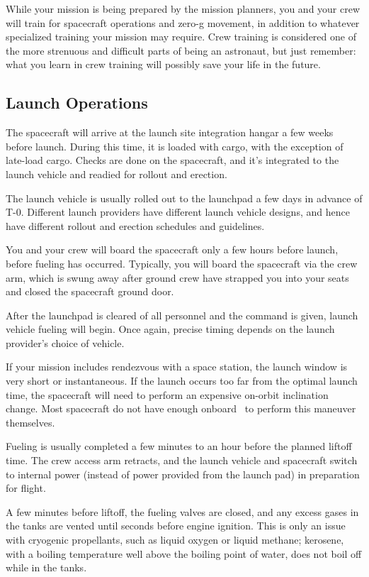 While your mission is being prepared by the mission planners, you and
your crew will train for spacecraft operations and zero-g movement, in
addition to whatever specialized training your mission may
require. Crew training is considered one of the more strenuous and
difficult parts of being an astronaut, but just remember: what you
learn in crew training will possibly save your life in the future.

\subsection{Launch Operations}

The spacecraft will arrive at the launch site integration hangar a few
weeks before launch. During this time, it is loaded with cargo, with
the exception of late-load cargo. Checks are done on the spacecraft,
and it's integrated to the launch vehicle and readied for rollout and
erection.

The launch vehicle is usually rolled out to the launchpad a few days
in advance of T-0. Different launch providers have different launch
vehicle designs, and hence have different rollout and erection
schedules and guidelines.

You and your crew will board the spacecraft only a few hours before
launch, before fueling has occurred. Typically, you will board the
spacecraft via the crew arm, which is swung away after ground crew
have strapped you into your seats and closed the spacecraft ground
door.

After the launchpad is cleared of all personnel and the command is
given, launch vehicle fueling will begin. Once again, precise timing
depends on the launch provider's choice of vehicle.

If your mission includes rendezvous with a space station, the launch
window is very short or instantaneous. If the launch occurs too far
from the optimal launch time, the spacecraft will need to perform an
expensive on-orbit inclination change. Most spacecraft do not have
enough onboard \dv\ to perform this maneuver themselves.

Fueling is usually completed a few minutes to an hour before the
planned liftoff time. The crew access arm retracts, and the launch
vehicle and spacecraft switch to internal power (instead of power
provided from the launch pad) in preparation for flight.

A few minutes before liftoff, the fueling valves are closed, and any
excess gases in the tanks are vented until seconds before engine
ignition. This is only an issue with cryogenic propellants, such as
liquid oxygen or liquid methane; kerosene, with a boiling temperature
well above the boiling point of water, does not boil off while in the
tanks.

